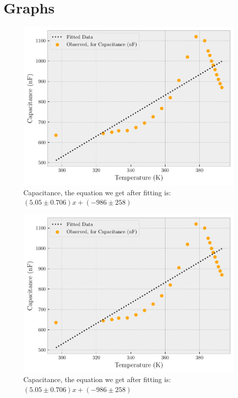 \documentclass{double}
\begin{document}
\section{Graphs}
\begin{figure}[H]
\centering
\includegraphics[width = \columnwidth]{./Capacitancebeta0.pdf}
\caption{Capacitance, the equation we get after fitting is: $(5.05 \pm 0.706)x + (-986 \pm 258)$}
\label{g:"capacitance"}
\end{figure}\begin{figure}[H]
\centering
\includegraphics[width = \columnwidth]{./Capacitancealpha0.pdf}
\caption{Capacitance, the equation we get after fitting is: $(5.05 \pm 0.706)x + (-986 \pm 258)$}
\label{g:"capacitance"}

\end{figure}
\end{document}

